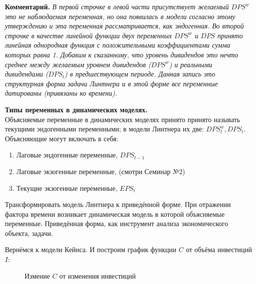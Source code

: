 \documentclass[12pt,a4paper]{article}
\begin{document}
\textbf{Комментарий.} \textit{В первой строчке в левой части присутствует желаемый $DPS^w$ это не наблюдаемая переменная, но она появилась в модели согласно этому утверждению и эта переменная рассматривается, как эндогенная. Во второй строчке в качестве линейной функции двух переменных $DPS^w$ и $DPS$ принято линейная однородная функция с положительными коэффициентами сумма которых равна 1. Добавим к сказанному, что уровень дивидендов это нечто среднее между желаемым уровнем дивидендов ($DPS^w$) и реальными дивидендами ($DPS_t$) в предшествующем периоде. Данная запись это структурная форма задачи Линтнера и в этой форме все переменные датированы (привязаны ко времени).}

\textbf{Типы переменных в динамических моделях.}\\
Объясняемые переменные в динамических моделях принято принято называть текущими эндогенными переменными; в модели Линтнера их две: $DPS_t^w, DPS_t$. \\
Объясняющие могут включать в себя:
\begin{enumerate}
\item Лаговые эндогенные переменные, $DPS_{t-1}$
\item Лаговые экзогенные переменные, (смотри Семинар №2)
\item Текущие экзогенные переменные, $EPS_t$
\end{enumerate}
 Трансформировать модель Линтнера к приведённой форме. При отражении фактора времени возникает динамическая модель в которой объясняемые переменные. Приведённая форма, как инструмент анализа экономического объекта, задачи.

Вернёмся к модели Кейнса. И построим график функции $C$ от объёма инвестиций $I$:

\begin{figure}[H]
\begin{center}
\caption{Измение $C$ от изменения инвестиций}
\end{center}
\end{figure}
\end{document}
